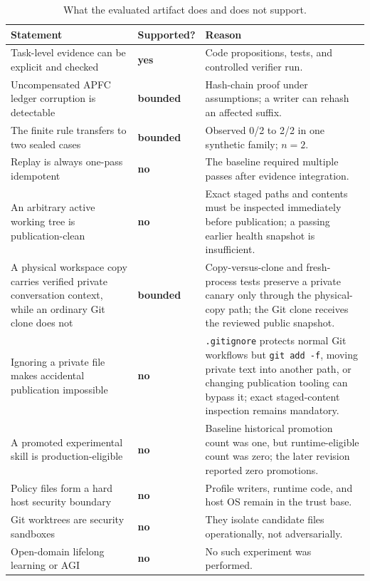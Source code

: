 \documentclass[10pt,twocolumn]{article}
\theoremstyle{definition}
\theoremstyle{plain}
\theoremstyle{remark}
\newcommand{\file}[1]{\nolinkurl{#1}}
\newcommand{\supported}{\textcolor{ActionGreen!80!black}{\textbf{yes}}}
\newcommand{\unsupported}{\textcolor{APFCRed!85!black}{\textbf{no}}}
\newcommand{\bounded}{\textcolor{SafetyOrange!90!black}{\textbf{bounded}}}
\begin{document}
\begin{table}[!t]
\centering
\caption{What the evaluated artifact does and does not support.}
\label{tab:limits}
\scriptsize
\begin{tabularx}{\textwidth}{@{}p{}p{}X@{}}
\toprule
Statement & Supported? & Reason \\
\midrule
Task-level evidence can be explicit and checked & \supported & Code propositions, tests, and controlled verifier run. \\
Uncompensated APFC ledger corruption is detectable & \bounded & Hash-chain proof under assumptions; a writer can rehash an affected suffix. \\
The finite rule transfers to two sealed cases & \bounded & Observed 0/2 to 2/2 in one synthetic family; $n=2$. \\
Replay is always one-pass idempotent & \unsupported & The baseline required multiple passes after evidence integration. \\
An arbitrary active working tree is publication-clean & \unsupported & Exact staged paths and contents must be inspected immediately before publication; a passing earlier health snapshot is insufficient. \\
A physical workspace copy carries verified private conversation context, while an ordinary Git clone does not & \bounded & Copy-versus-clone and fresh-process tests preserve a private canary only through the physical-copy path; the Git clone receives the reviewed public snapshot. \\
Ignoring a private file makes accidental publication impossible & \unsupported & \file{.gitignore} protects normal Git workflows but \file{git add -f}, moving private text into another path, or changing publication tooling can bypass it; exact staged-content inspection remains mandatory. \\
A promoted experimental skill is production-eligible & \unsupported & Baseline historical promotion count was one, but runtime-eligible count was zero; the later revision reported zero promotions. \\
Policy files form a hard host security boundary & \unsupported & Profile writers, runtime code, and host OS remain in the trust base. \\
Git worktrees are security sandboxes & \unsupported & They isolate candidate files operationally, not adversarially. \\
Open-domain lifelong learning or AGI & \unsupported & No such experiment was performed. \\

\end{tabularx}
\end{table}
\end{document}

